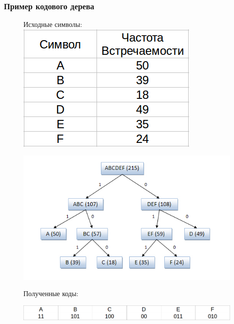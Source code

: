 \documentclass[10pt,pdf,hyperref={unicode}]{beamer}
\begin{document}
\begin{frame}
	\frametitle{Пример кодового дерева}
		
	\begin{figure}
		\begin{minipage}{0.25\textwidth}
		\raggedright{\scriptsize{Исходные символы:}}
		\includegraphics[width=\textwidth]{tree_sym.png}
		\end{minipage}
		\begin{minipage}{0.74\textwidth}
		\includegraphics[width=\textwidth, trim= 20 20 50 15, clip=true]{tree.png}
		\end{minipage}
	\raggedright{Полученные коды:}
	
	\vspace{1em}
	\begin{minipage}[b]{\textwidth}
		\includegraphics[width=\textwidth]{tree_code.png}
	\end{minipage}
	\end{figure}
\end{frame}
\end{document}

